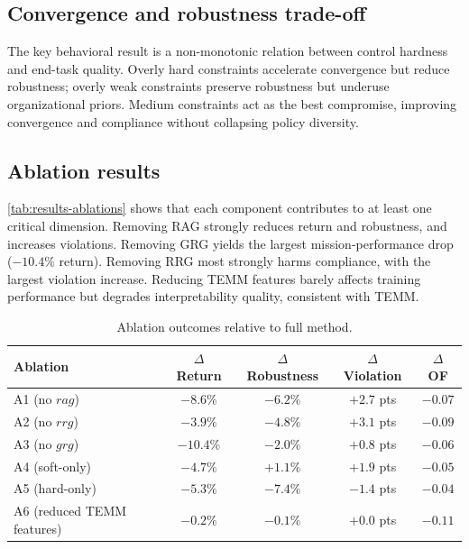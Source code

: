 \documentclass[sigconf]{aamas}
\begin{document}
\subsection{Convergence and robustness trade-off}
The key behavioral result is a non-monotonic relation between control hardness and end-task quality. Overly hard constraints accelerate convergence but reduce robustness; overly weak constraints preserve robustness but underuse organizational priors. Medium constraints act as the best compromise, improving convergence and compliance without collapsing policy diversity.

\subsection{Ablation results}
\autoref{tab:results-ablations} shows that each component contributes to at least one critical dimension. Removing RAG strongly reduces return and robustness, and increases violations. Removing GRG yields the largest mission-performance drop ($-10.4\%$ return). Removing RRG most strongly harms compliance, with the largest violation increase. Reducing TEMM features barely affects training performance but degrades interpretability quality, consistent with TEMM.

\begin{table}[h!]
    \caption{Ablation outcomes relative to full method.}
    \label{tab:results-ablations}
    \centering
    \scriptsize
    \begin{tabularx}{\columnwidth}{l c c c c}
        \toprule
        Ablation                   & $\Delta$ Return & $\Delta$ Robustness & $\Delta$ Violation & $\Delta$ OF \\
        \midrule
        A1 (no $rag$)              & $-8.6\%$        & $-6.2\%$            & $+2.7$ pts         & $-0.07$     \\
        A2 (no $rrg$)              & $-3.9\%$        & $-4.8\%$            & $+3.1$ pts         & $-0.09$     \\
        A3 (no $grg$)              & $-10.4\%$       & $-2.0\%$            & $+0.8$ pts         & $-0.06$     \\
        A4 (soft-only)             & $-4.7\%$        & $+1.1\%$            & $+1.9$ pts         & $-0.05$     \\
        A5 (hard-only)             & $-5.3\%$        & $-7.4\%$            & $-1.4$ pts         & $-0.04$     \\
        A6 (reduced TEMM features) & $-0.2\%$        & $-0.1\%$            & $+0.0$ pts         & $-0.11$     \\
        \bottomrule
    \end{tabularx}
\end{table}
\end{document}
